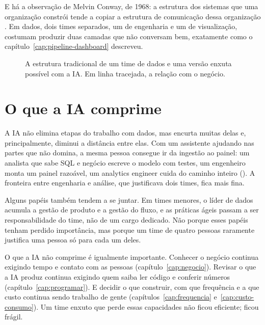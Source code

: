 E há a observação de Melvin Conway, de 1968: a estrutura dos sistemas que uma organização
constrói tende a copiar a estrutura de comunicação dessa organização \parencite{conway1968}.
Em dados, dois times separados, um de engenharia e um de visualização, costumam produzir duas
camadas que não conversam bem, exatamente como o capítulo~\ref{cap:pipeline-dashboard}
descreveu.

\begin{figure}[htbp]
  \centering
  
  \caption{A estrutura tradicional de um time de dados e uma versão enxuta possível com
    a IA. Em linha tracejada, a relação com o negócio.}
  \label{fig:estrutura-times}
\end{figure}


\section{O que a IA comprime}
\label{sec:ia-comprime}

A IA não elimina etapas do trabalho com dados, mas encurta muitas delas e, principalmente,
diminui a distância entre elas. Com um assistente ajudando nas partes que não domina, a mesma
pessoa consegue ir da ingestão ao painel: um analista que sabe SQL e negócio escreve o modelo
com testes, um engenheiro monta um painel razoável, um analytics engineer cuida do caminho
inteiro (). A fronteira entre engenharia e análise, que justificava dois times,
fica mais fina.

Alguns papéis também tendem a se juntar. Em times menores, o líder de dados acumula a gestão
de produto e a gestão do fluxo, e as práticas ágeis passam a ser responsabilidade do time,
não de um cargo dedicado. Não porque esses papéis tenham perdido importância, mas porque um
time de quatro pessoas raramente justifica uma pessoa só para cada um deles.

O que a IA não comprime é igualmente importante. Conhecer o negócio continua exigindo tempo e
contato com as pessoas (capítulo~\ref{cap:negocio}). Revisar o que a IA produz continua
exigindo quem saiba ler código e conferir números (capítulo~\ref{cap:programar}). E decidir o
que construir, com que frequência e a que custo continua sendo trabalho de gente
(capítulos~\ref{cap:frequencia} e~\ref{cap:custo-consumo}). Um time enxuto que perde essas
capacidades não ficou eficiente; ficou frágil.

